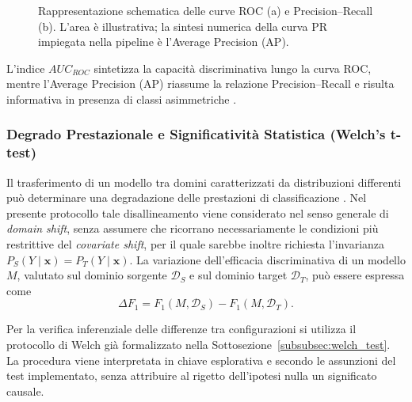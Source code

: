 \begin{figure}[H]
    \caption{Rappresentazione schematica delle curve ROC (a) e Precision--Recall (b). L'area è illustrativa; la sintesi numerica della curva PR impiegata nella pipeline è l'Average Precision (AP).}
    \label{fig:curve_roc_pr}
\end{figure}

L'indice $AUC_{ROC}$ sintetizza la capacità discriminativa lungo la curva ROC, mentre l'Average Precision (AP) riassume la relazione Precision--Recall e risulta informativa in presenza di classi asimmetriche \cite{saito2015}.

\subsubsection{Degrado Prestazionale e Significatività Statistica (Welch's t-test)}
\label{subsubsec:significativita_statistica}

Il trasferimento di un modello tra domini caratterizzati da distribuzioni differenti può determinare una degradazione delle prestazioni di classificazione \cite{pan2010}. Nel presente protocollo tale disallineamento viene considerato nel senso generale di \textit{domain shift}, senza assumere che ricorrano necessariamente le condizioni più restrittive del \textit{covariate shift}, per il quale sarebbe inoltre richiesta l'invarianza $P_S(Y \mid \mathbf{x}) = P_T(Y \mid \mathbf{x})$. La variazione dell'efficacia discriminativa di un modello $M$, valutato sul dominio sorgente $\mathcal{D}_S$ e sul dominio target $\mathcal{D}_T$, può essere espressa come
\begin{equation}
    \Delta F_1=F_1(M,\mathcal{D}_S)-F_1(M,\mathcal{D}_T).
\end{equation}

Per la verifica inferenziale delle differenze tra configurazioni si utilizza il protocollo di Welch già formalizzato nella Sottosezione~\ref{subsubsec:welch_test}. La procedura viene interpretata in chiave esplorativa e secondo le assunzioni del test implementato, senza attribuire al rigetto dell'ipotesi nulla un significato causale.

